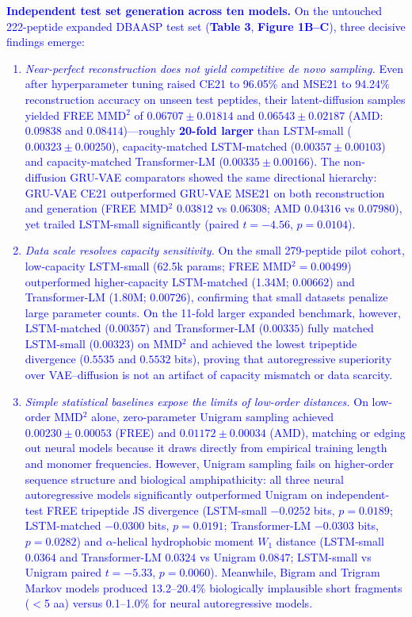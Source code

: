 \documentclass[unnumsec,webpdf,contemporary,large]{oup-authoring-template}
\newcommand{\rev}[1]{\textcolor{blue}{#1}}
\begin{document}
\rev{\textbf{Independent test set generation across ten models.} On the untouched 222-peptide expanded DBAASP test set (\textbf{Table 3}, \textbf{Figure 1B--C}), three decisive findings emerge:
\begin{enumerate}
\item \textit{Near-perfect reconstruction does not yield competitive de novo sampling.} Even after hyperparameter tuning raised CE21 to 96.05\% and MSE21 to 94.24\% reconstruction accuracy on unseen test peptides, their latent-diffusion samples yielded FREE MMD$^2$ of $0.06707\pm 0.01814$ and $0.06543\pm 0.02187$ (AMD: $0.09838$ and $0.08414$)---roughly \textbf{20-fold larger} than LSTM-small ($0.00323\pm 0.00250$), capacity-matched LSTM-matched ($0.00357\pm 0.00103$) and capacity-matched Transformer-LM ($0.00335\pm 0.00166$). The non-diffusion GRU-VAE comparators showed the same directional hierarchy: GRU-VAE CE21 outperformed GRU-VAE MSE21 on both reconstruction and generation (FREE MMD$^2$ $0.03812$ vs $0.06308$; AMD $0.04316$ vs $0.07980$), yet trailed LSTM-small significantly (paired $t=-4.56$, $p=0.0104$).
\item \textit{Data scale resolves capacity sensitivity.} On the small 279-peptide pilot cohort, low-capacity LSTM-small (62.5k params; FREE MMD$^2=0.00499$) outperformed higher-capacity LSTM-matched (1.34M; $0.00662$) and Transformer-LM (1.80M; $0.00726$), confirming that small datasets penalize large parameter counts. On the 11-fold larger expanded benchmark, however, LSTM-matched ($0.00357$) and Transformer-LM ($0.00335$) fully matched LSTM-small ($0.00323$) on MMD$^2$ and achieved the lowest tripeptide divergence ($0.5535$ and $0.5532$ bits), proving that autoregressive superiority over VAE--diffusion is not an artifact of capacity mismatch or data scarcity.
\item \textit{Simple statistical baselines expose the limits of low-order distances.} On low-order MMD$^2$ alone, zero-parameter Unigram sampling achieved $0.00230\pm 0.00053$ (FREE) and $0.01172\pm 0.00034$ (AMD), matching or edging out neural models because it draws directly from empirical training length and monomer frequencies. However, Unigram sampling fails on higher-order sequence structure and biological amphipathicity: all three neural autoregressive models significantly outperformed Unigram on independent-test FREE tripeptide JS divergence (LSTM-small $-0.0252$ bits, $p=0.0189$; LSTM-matched $-0.0300$ bits, $p=0.0191$; Transformer-LM $-0.0303$ bits, $p=0.0282$) and $\alpha$-helical hydrophobic moment $W_1$ distance (LSTM-small $0.0364$ and Transformer-LM $0.0324$ vs Unigram $0.0847$; LSTM-small vs Unigram paired $t=-5.33$, $p=0.0060$). Meanwhile, Bigram and Trigram Markov models produced 13.2--20.4\% biologically implausible short fragments ($<$5 aa) versus 0.1--1.0\% for neural autoregressive models.
\end{enumerate}}
\end{document}
